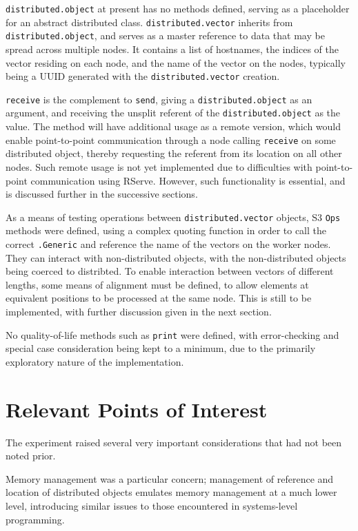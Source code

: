 \documentclass[a4paper,10pt]{article}
\begin{document}
\texttt{distributed.object} at present has no methods defined, serving as a
placeholder for an abstract distributed class.
\texttt{distributed.vector} inherits from \texttt{distributed.object}, and
serves as a master reference to data that may be spread across multiple nodes.
It contains a list of hostnames, the indices of the vector residing on each
node, and the name of the vector on the nodes, typically being a UUID generated
with the \texttt{distributed.vector} creation.

\texttt{receive} is the complement to \texttt{send}, giving a \texttt{distributed.object} as an
argument, and receiving the unsplit referent of the \texttt{distributed.object} as the
value.
The method will have additional usage as a remote version, which would enable
point-to-point communication through a node calling \texttt{receive} on some distributed
object, thereby requesting the referent from its location on all other nodes.
Such remote usage is not yet implemented due to difficulties with
point-to-point communication using RServe.
However, such functionality is essential, and is discussed further in the
successive sections.

As a means of testing operations between \texttt{distributed.vector} objects, S3 \texttt{Ops}
methods were defined, using a complex quoting function in order to call the
correct \texttt{.Generic} and reference the name of the vectors on the worker nodes.
They can interact with non-distributed objects, with the non-distributed
objects being coerced to distribted.
To enable interaction between vectors of different lengths, some means of
alignment must be defined, to allow elements at equivalent positions to be
processed at the same node.
This is still to be implemented, with further discussion given in the next
section.

No quality-of-life methods such as \texttt{print} were defined, with error-checking
and special case consideration being kept to a minimum, due to the primarily
exploratory nature of the implementation.

\section{Relevant Points of Interest}

The experiment raised several very important considerations that had not been
noted prior.

Memory management was a particular concern; 
management of reference and location of distributed objects emulates memory
management at a much lower level, introducing similar issues to those
encountered in systems-level programming.
\end{document}
